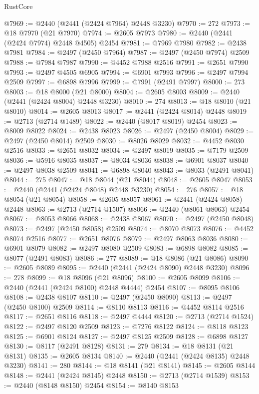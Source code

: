 \begin{lexlean}{RustCore}
\begin{coremodule}
@7969 := @2440 (@2441 (@2424 @7964) @2448 @3230)
@7970 := 272
@7973 := @18 @7970 (@21 @7970)
@7974 := @2605 @7973
@7980 := @2440 (@2441 (@2424 @7974) @2448 @4505) @2454
@7981 := @7969 @7980
@7982 := @2438 @7981
@7984 := @2497 (@2450 @7964)
@7987 := @2497 (@2450 @7974) @2509
@7988 := @7984 @7987
@7990 := @4452 @7988 @2516
@7991 := @2651 @7990
@7993 := @2497 @4505 @6905
@7994 := @6901 @7993
@7996 := @2497 @7994 @2509
@7997 := @6898 @7996
@7999 := @7991 (@2491 @7997)
@8000 := 273
@8003 := @18 @8000 (@21 @8000)
@8004 := @2605 @8003
@8009 := @2440 (@2441 (@2424 @8004) @2448 @3230)
@8010 := 274
@8013 := @18 @8010 (@21 @8010)
@8014 := @2605 @8013
@8017 := @2441 (@2424 @8014) @2448
@8019 := @2713 (@2714 @1489)
@8022 := @2440 (@8017 @8019) @2454
@8023 := @8009 @8022
@8024 := @2438 @8023
@8026 := @2497 (@2450 @8004)
@8029 := @2497 (@2450 @8014) @2509
@8030 := @8026 @8029
@8032 := @4452 @8030 @2516
@8033 := @2651 @8032
@8034 := @2497 @8019
@8035 := @7179 @2509
@8036 := @5916 @8035
@8037 := @8034 @8036
@8038 := @6901 @8037
@8040 := @2497 @8038 @2509
@8041 := @6898 @8040
@8043 := @8033 (@2491 @8041)
@8044 := 275
@8047 := @18 @8044 (@21 @8044)
@8048 := @2605 @8047
@8053 := @2440 (@2441 (@2424 @8048) @2448 @3230)
@8054 := 276
@8057 := @18 @8054 (@21 @8054)
@8058 := @2605 @8057
@8061 := @2441 (@2424 @8058) @2448
@8063 := @2713 (@2714 @1507)
@8066 := @2440 (@8061 @8063) @2454
@8067 := @8053 @8066
@8068 := @2438 @8067
@8070 := @2497 (@2450 @8048)
@8073 := @2497 (@2450 @8058) @2509
@8074 := @8070 @8073
@8076 := @4452 @8074 @2516
@8077 := @2651 @8076
@8079 := @2497 @8063 @8036
@8080 := @6901 @8079
@8082 := @2497 @8080 @2509
@8083 := @6898 @8082
@8085 := @8077 (@2491 @8083)
@8086 := 277
@8089 := @18 @8086 (@21 @8086)
@8090 := @2605 @8089
@8095 := @2440 (@2441 (@2424 @8090) @2448 @3230)
@8096 := 278
@8099 := @18 @8096 (@21 @8096)
@8100 := @2605 @8099
@8106 := @2440 (@2441 (@2424 @8100) @2448 @4444) @2454
@8107 := @8095 @8106
@8108 := @2438 @8107
@8110 := @2497 (@2450 @8090)
@8113 := @2497 (@2450 @8100) @2509
@8114 := @8110 @8113
@8116 := @4452 @8114 @2516
@8117 := @2651 @8116
@8118 := @2497 @4444
@8120 := @2713 (@2714 @1524)
@8122 := @2497 @8120 @2509
@8123 := @7276 @8122
@8124 := @8118 @8123
@8125 := @6901 @8124
@8127 := @2497 @8125 @2509
@8128 := @6898 @8127
@8130 := @8117 (@2491 @8128)
@8131 := 279
@8134 := @18 @8131 (@21 @8131)
@8135 := @2605 @8134
@8140 := @2440 (@2441 (@2424 @8135) @2448 @3230)
@8141 := 280
@8144 := @18 @8141 (@21 @8141)
@8145 := @2605 @8144
@8148 := @2441 (@2424 @8145) @2448
@8150 := @2713 (@2714 @1539)
@8153 := @2440 (@8148 @8150) @2454
@8154 := @8140 @8153

\end{coremodule}
\end{lexlean}
